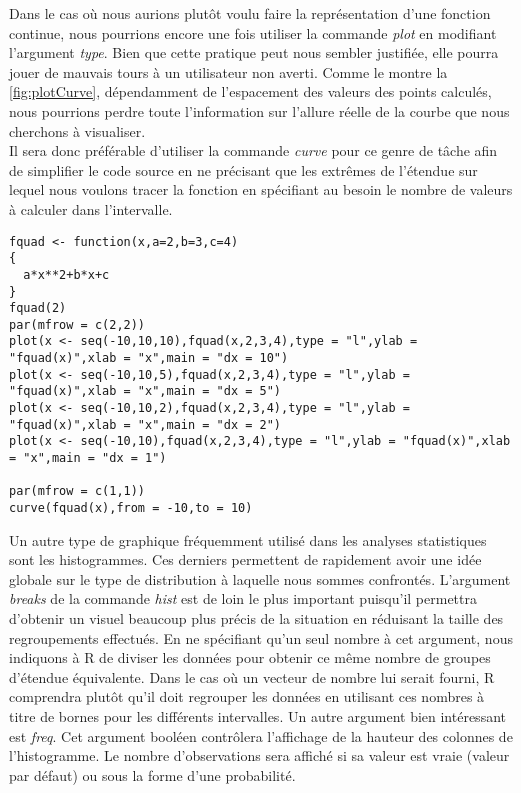 \vspace{\baselineskip}
\noindent
Dans le cas où nous aurions plutôt voulu faire la représentation d'une fonction continue, nous pourrions encore une fois utiliser la commande \emph{plot} en modifiant l'argument \emph{type}. Bien que cette pratique peut nous sembler justifiée, elle pourra jouer de mauvais tours à un utilisateur non averti. Comme le montre la \autoref{fig:plotCurve}, dépendamment de l'espacement des valeurs des points calculés, nous pourrions perdre toute l'information sur l'allure réelle de la courbe que nous cherchons à visualiser. \\

\noindent
Il sera donc préférable d'utiliser la commande \emph{curve} \cite{Rfunction:curve} pour ce genre de tâche afin de simplifier le code source en ne précisant que les extrêmes de l'étendue sur lequel nous voulons tracer la fonction en spécifiant au besoin le nombre de valeurs à calculer dans l'intervalle. \\

\begin{lstlisting}[caption = Utilisation de la commande \emph{curve},label=src:plotCurve]
fquad <- function(x,a=2,b=3,c=4)
{
  a*x**2+b*x+c
}
fquad(2)
par(mfrow = c(2,2))
plot(x <- seq(-10,10,10),fquad(x,2,3,4),type = "l",ylab = "fquad(x)",xlab = "x",main = "dx = 10")
plot(x <- seq(-10,10,5),fquad(x,2,3,4),type = "l",ylab = "fquad(x)",xlab = "x",main = "dx = 5")
plot(x <- seq(-10,10,2),fquad(x,2,3,4),type = "l",ylab = "fquad(x)",xlab = "x",main = "dx = 2")
plot(x <- seq(-10,10),fquad(x,2,3,4),type = "l",ylab = "fquad(x)",xlab = "x",main = "dx = 1")

par(mfrow = c(1,1))
curve(fquad(x),from = -10,to = 10)
\end{lstlisting}



\vspace{\baselineskip}
\noindent
Un autre type de graphique fréquemment utilisé dans les analyses statistiques sont les histogrammes. Ces derniers permettent de rapidement avoir une idée globale sur le type de distribution à laquelle nous sommes confrontés. L'argument \emph{breaks} de la commande \emph{hist} \cite{Rfunction:hist} est de loin le plus important puisqu'il permettra d'obtenir un visuel beaucoup plus précis de la situation en réduisant la taille des regroupements effectués. En ne spécifiant qu'un seul nombre à cet argument, nous indiquons à R de diviser les données pour obtenir ce même nombre de groupes d'étendue équivalente. Dans le cas où un vecteur de nombre lui serait fourni, R comprendra plutôt qu'il doit regrouper les données en utilisant ces nombres à titre de bornes pour les différents intervalles. Un autre argument bien intéressant est \emph{freq}. Cet argument booléen contrôlera l'affichage de la hauteur des colonnes de l'histogramme. Le nombre d'observations sera affiché si sa valeur est vraie (valeur par défaut) ou sous la forme d'une probabilité. \\

